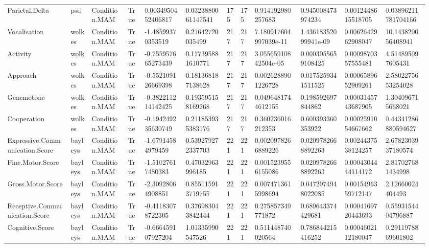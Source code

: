 \begin{longtable}{llllllllllll}
Parietal.Delta & psd & Condition.MAM & True & 0.0034950452406817 & 0.0323880061147541 & 175 & 175 & 0.914192980257683 & 0.945008473974234 & 0.0012448615518705 & 0.03896211781704166 \\
Vocalisation & wolkes & Condition.MAM & True & -1.48599370353519 & 0.21642720035499 & 217 & 217 & 7.180917604997039e-11 & 1.43618352099941e-09 & 0.0062642962908047 & 10.143820056408941 \\
Activity & wolkes & Condition.MAM & True & -0.755957665273439 & 0.177395881610771 & 217 & 217 & 3.05565910842504e-05 & 0.0003055659108425 & 0.0009870357555481 & 4.514895097605431 \\
Approach & wolkes & Condition.MAM & True & -0.552109126669398 & 0.181368187138628 & 217 & 217 & 0.0026288901226728 & 0.0175259341511525 & 0.0006589652909261 & 2.5802275653254028 \\
Genemotone & wolkes & Condition.MAM & True & -0.382211214142425 & 0.193595158169268 & 217 & 217 & 0.0496481744612155 & 0.198592697844862 & 0.0003145743687905 & 1.304096715668021 \\
Cooperation & wolkes & Condition.MAM & True & -0.194249235630749 & 0.211853935383176 & 217 & 217 & 0.360236016212353 & 0.600393360353922 & 0.0002591054667662 & 0.44341286880594627 \\
Expressive.Communication.Score & bayleys & Condition.MAM & True & -1.67914584979459 & 0.539279272337703 & 221 & 221 & 0.0020978266889226 & 0.0209782668892263 & 0.0024437538124257 & 2.6782303937180574 \\
Fine.Motor.Score & bayleys & Condition.MAM & True & -1.51027617480383 & 0.47032963996185 & 221 & 221 & 0.0015239556155086 & 0.0209782668892263 & 0.0004304444114172 & 2.817027681434998 \\
Gross.Motor.Score & bayleys & Condition.MAM & True & -2.30928064908851 & 0.855115913719755 & 221 & 221 & 0.0074713615998694 & 0.0472974948022085 & 0.0015496359712147 & 2.12660024404493 \\
Receptive.Communication.Score & bayleys & Condition.MAM & True & -0.41183078722305 & 0.376983043842444 & 221 & 221 & 0.275857349771872 & 0.689643374429681 & 0.0004169720443693 & 0.5593154404796887 \\
Cognitive.Score & bayleys & Condition.MAM & True & -0.666459107927204 & 1.01335990547526 & 221 & 221 & 0.511448740020564 & 0.786844215416252 & 0.0004602112180047 & 0.2911978869601802 \\
\end{longtable}
